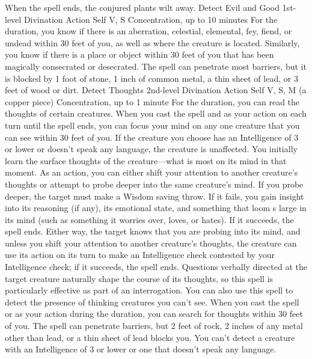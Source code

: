 \documentclass[a4paper,10pt,bg=print]{dndbook} %
\begin{document}
	When the spell ends, the conjured plants wilt away.\linebreak
	\DndSpellHeader
	{Detect Evil and Good}
	{1st-level Divination}
	{Action}
	{Self}
	{V, S}
	{Concentration, up to 10 minutes}
	For the duration, you know if there is an aberration, celestial, elemental, fey, fiend, or undead within 30 feet of you, as well as where the creature is located. Similarly, you know if there is a place or object within 30 feet of you that has been magically consecrated or desecrated.\linebreak
	The spell can penetrate most barriers, but it is blocked by 1 foot of stone, 1 inch of common metal, a thin sheet of lead, or 3 feet of wood or dirt.\linebreak
	\DndSpellHeader
	{Detect Thoughts}
	{2nd-level Divination}
	{Action}
	{Self}
	{V, S, M (a copper piece)}
	{Concentration, up to 1 minute}
	For the duration, you can read the thoughts of certain creatures. When you cast the spell and as your action on each turn until the spell ends, you can focus your mind on any one creature that you can see within 30 feet of you. If the creature you choose has an Intelligence of 3 or lower or doesn’t speak any language, the creature is unaffected.\linebreak
	You initially learn the surface thoughts of the creature—what is most on its mind in that moment. As an action, you can either shift your attention to another creature’s thoughts or attempt to probe deeper into the same creature’s mind. If you probe deeper, the target must make a Wisdom saving throw. If it fails, you gain insight into its reasoning (if any), its emotional state, and something that loom s large in its mind (such as something it worries over, loves, or hates). If it succeeds, the spell ends. Either way, the target knows that you are probing into its mind, and unless you shift your attention to another creature’s thoughts, the creature can use its action on its turn to make an Intelligence check contested by your Intelligence check; if it succeeds, the spell ends.\linebreak
	Questions verbally directed at the target creature naturally shape the course of its thoughts, so this spell is particularly effective as part of an interrogation.\linebreak
	You can also use this spell to detect the presence of thinking creatures you can’t see. When you cast the spell or as your action during the duration, you can search for thoughts within 30 feet of you. The spell can penetrate barriers, but 2 feet of rock, 2 inches of any metal other than lead, or a thin sheet of lead blocks you. You can’t detect a creature with an Intelligence of 3 or lower or one that doesn’t speak any language.\linebreak
\end{document}
